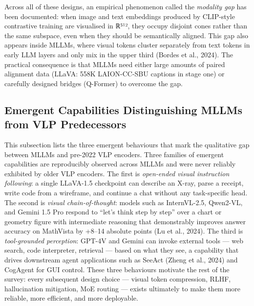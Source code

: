 Across all of these designs, an empirical phenomenon called the \emph{modality gap} has been documented: when image and text embeddings produced by CLIP-style contrastive training are visualised in ℝ⁵¹², they occupy disjoint cones rather than the same subspace, even when they should be semantically aligned. This gap also appears inside MLLMs, where visual tokens cluster separately from text tokens in early LLM layers and only mix in the upper third (Bordes et al., 2024). The practical consequence is that MLLMs need either large amounts of paired alignment data (LLaVA: 558K LAION-CC-SBU captions in stage one) or carefully designed bridges (Q-Former) to overcome the gap.

\subsection{Emergent Capabilities Distinguishing MLLMs from VLP Predecessors}\label{emergent-capabilities-distinguishing-mllms-from-vlp-predecessors}

This subsection lists the three emergent behaviours that mark the qualitative gap between MLLMs and pre-2022 VLP encoders. Three families of emergent capabilities are reproducibly observed across MLLMs and were never reliably exhibited by older VLP encoders. The first is \emph{open-ended visual instruction following}: a single LLaVA-1.5 checkpoint can describe an X-ray, parse a receipt, write code from a wireframe, and continue a chat without any task-specific head. The second is \emph{visual chain-of-thought}: models such as InternVL-2.5, Qwen2-VL, and Gemini 1.5 Pro respond to ``let's think step by step'' over a chart or geometry figure with intermediate reasoning that demonstrably improves answer accuracy on MathVista by +8--14 absolute points (Lu et al., 2024). The third is \emph{tool-grounded perception}: GPT-4V and Gemini can invoke external tools --- web search, code interpreter, retrieval --- based on what they see, a capability that drives downstream agent applications such as SeeAct (Zheng et al., 2024) and CogAgent for GUI control. These three behaviours motivate the rest of the survey: every subsequent design choice --- visual token compression, RLHF, hallucination mitigation, MoE routing --- exists ultimately to make them more reliable, more efficient, and more deployable.

